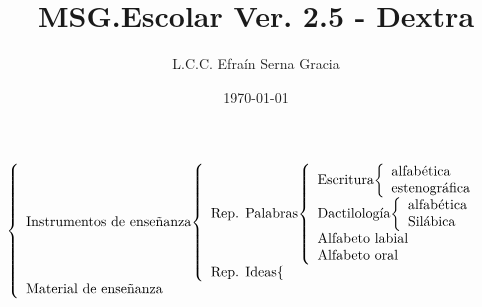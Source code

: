 \documentclass[12pt,spanish,lettersize]{book}
\title{MSG.Escolar Ver. 2.5 - Dextra}
\author{L.C.C. Efra\'in Serna Gracia}
\date{\today}
\begin{document}
\begin{equation}
  \left\lbrace
  \begin{array}{l}
   $Instrumentos de ense\~nanza$ 
   \left\lbrace
   \begin{array}{l}
     $Rep. Palabras$  
     \left\lbrace
     \begin{array}{l}
       $Escritura$  
       \left\lbrace
       \begin{array}{l}
         $alfab\'etica$ \\
         $estenogr\'afica$ \\
       \end{array}
       \right. \\
       $Dactilolog\'ia$  
       \left\lbrace
       \begin{array}{l}
         $alfab\'etica$ \\
         $Sil\'abica$ \\
       \end{array}
       \right. \\
       $Alfabeto labial$  \\
       $Alfabeto oral$  \\
     \end{array}
     \right. \\
     $Rep. Ideas$
     \left\lbrace
     \begin{array}{l}
     \end{array}
     \right.
   \end{array}
   \right. \\
   $Material de ense\~nanza$  \\
  \end{array}
  \right.
\end{equation}
\end{document}
